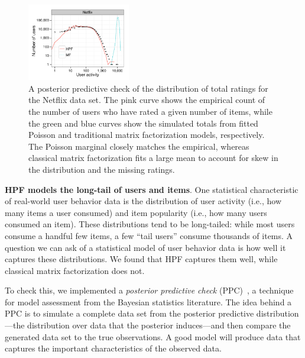 \begin{figure}[t!]
  \centering
  \includegraphics[width=0.4\textwidth]{figures/user_activity_sim_netflix.pdf}
  \caption{A posterior predictive check of the distribution of total
    ratings for the Netflix data set.  The pink curve shows the
    empirical count of the number of users who have rated a given
    number of items, while the green and blue curves show the
    simulated totals from fitted Poisson and traditional matrix
    factorization models, respectively. The Poisson marginal closely
    matches the empirical, whereas classical matrix factorization fits
    a large mean to account for skew in the distribution and the
    missing ratings.}
\label{fig:marginals}
\end{figure}

{\bf HPF models the long-tail of users and items}.  One statistical
characteristic of real-world user behavior data is the distribution of
user activity (i.e., how many items a user consumed) and item
popularity (i.e., how many users consumed an item).  These
distributions tend to be long-tailed: while most users consume a
handful few items, a few ``tail users'' consume thousands of items.  A
question we can ask of a statistical model of user behavior data is
how well it captures these distributions.  We found that HPF captures
them well, while classical matrix factorization does not.

To check this, we implemented a \textit{posterior predictive check}
(PPC)~\cite{Rubin:1984,Gelman:1996}, a technique for model assessment
from the Bayesian statistics literature.  The idea behind a PPC is to
simulate a complete data set from the posterior predictive
distribution---the distribution over data that the posterior
induces---and then compare the generated data set to the true
observations. A good model will produce data that captures the
important characteristics of the observed data.


